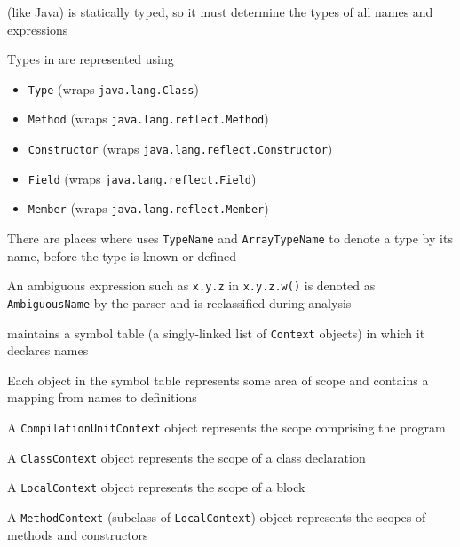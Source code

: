 \documentclass[8pt,a4paper,compress]{beamer}
\begin{document}
\begin{frame}[fragile]
\pause

\jmm (like Java) is statically typed, so it must determine the types of all names and expressions

\pause\bigskip

Types in \jmm are represented using
\begin{itemize}
\pause
\item \lstinline{Type} (wraps \lstinline{java.lang.Class})

\pause
\item \lstinline{Method} (wraps \lstinline{java.lang.reflect.Method})

\pause
\item \lstinline{Constructor} (wraps \lstinline{java.lang.reflect.Constructor})

\pause
\item \lstinline{Field} (wraps \lstinline{java.lang.reflect.Field})

\pause
\item \lstinline{Member} (wraps \lstinline{java.lang.reflect.Member})
\end{itemize}

\pause\bigskip

There are places where \jmm uses \lstinline{TypeName} and \lstinline{ArrayTypeName} to denote a type by its name, before the type is known or defined

\pause\bigskip

An ambiguous expression such as \lstinline{x.y.z} in \lstinline{x.y.z.w()} is denoted as \lstinline{AmbiguousName} by the parser and is reclassified during analysis
\end{frame}

\begin{frame}[fragile]
\pause

\jmm maintains a symbol table (a singly-linked list of \lstinline{Context} objects) in which it declares names

\pause\bigskip

Each object in the symbol table represents some area of scope and contains a mapping from names to definitions

\pause\bigskip

A \lstinline{CompilationUnitContext} object represents the scope comprising the program

\pause\bigskip

A \lstinline{ClassContext} object represents the scope of a class declaration

\pause\bigskip

A \lstinline{LocalContext} object represents the scope of a block

\pause\bigskip

A \lstinline{MethodContext} (subclass of \lstinline{LocalContext}) object represents the scopes of methods and constructors
\end{frame}
\end{document}
